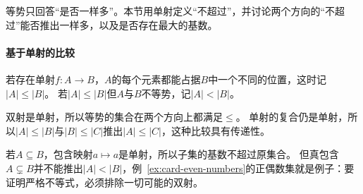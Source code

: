 等势只回答“是否一样多”。本节用单射定义“不超过”，并讨论两个方向的“不超过”能否推出一样多，以及是否存在最大的基数。

\paragraph{基于单射的比较}
若存在单射$f:A\to B$，$A$的每个元素都能占据$B$中一个不同的位置，这时记$|A|\leq|B|$。
若$|A|\leq|B|$但$A$与$B$不等势，记$|A|<|B|$。

双射是单射，所以等势的集合在两个方向上都满足$\leq$。
单射的复合仍是单射，所以$|A|\leq|B|$与$|B|\leq|C|$推出$|A|\leq|C|$，这种比较具有传递性。

若$A\subseteq B$，包含映射$a\mapsto a$是单射，所以子集的基数不超过原集合。
但真包含$A\subsetneq B$并不能推出$|A|<|B|$，例~\ref{ex:card-even-numbers}的正偶数集就是例子：要证明严格不等式，必须排除一切可能的双射。

